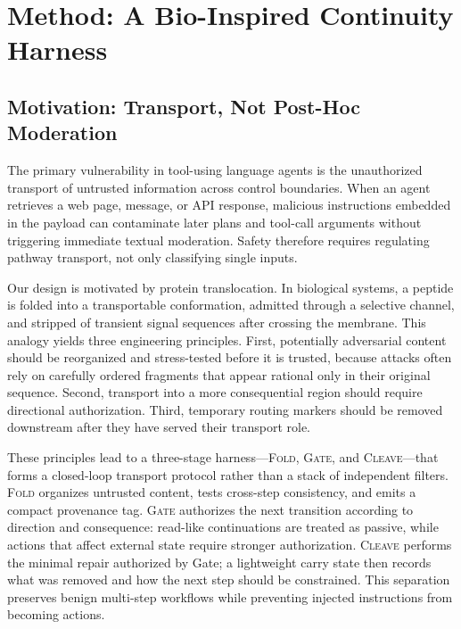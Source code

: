 \section{Method: A Bio-Inspired Continuity Harness}
\label{sec:method}

\subsection{Motivation: Transport, Not Post-Hoc Moderation}

The primary vulnerability in tool-using language agents is the unauthorized transport of untrusted information across control boundaries. When an agent retrieves a web page, message, or API response, malicious instructions embedded in the payload can contaminate later plans and tool-call arguments without triggering immediate textual moderation. Safety therefore requires regulating pathway transport, not only classifying single inputs.

Our design is motivated by protein translocation. In biological systems, a peptide is folded into a transportable conformation, admitted through a selective channel, and stripped of transient signal sequences after crossing the membrane. This analogy yields three engineering principles. First, potentially adversarial content should be reorganized and stress-tested before it is trusted, because attacks often rely on carefully ordered fragments that appear rational only in their original sequence. Second, transport into a more consequential region should require directional authorization. Third, temporary routing markers should be removed downstream after they have served their transport role.

These principles lead to a three-stage harness---\textsc{Fold}, \textsc{Gate}, and \textsc{Cleave}---that forms a closed-loop transport protocol rather than a stack of independent filters. \textsc{Fold} organizes untrusted content, tests cross-step consistency, and emits a compact provenance tag. \textsc{Gate} authorizes the next transition according to direction and consequence: read-like continuations are treated as passive, while actions that affect external state require stronger authorization. \textsc{Cleave} performs the minimal repair authorized by Gate; a lightweight carry state then records what was removed and how the next step should be constrained. This separation preserves benign multi-step workflows while preventing injected instructions from becoming actions.

